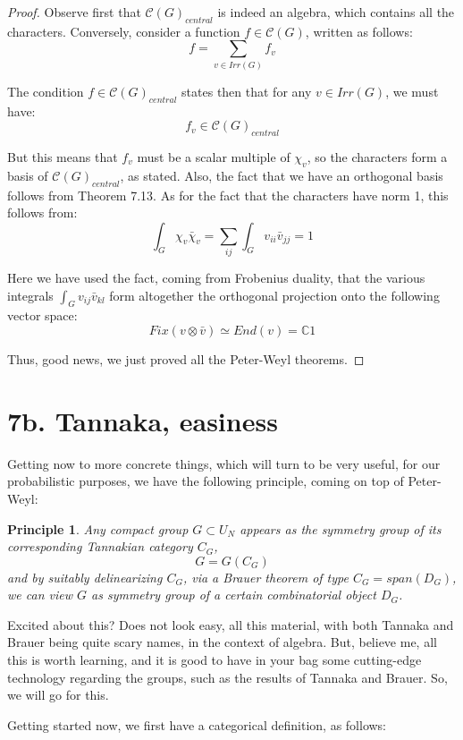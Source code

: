 \documentclass[12pt]{amsbook}
\newtheorem{principle}[theorem]{Principle}
\begin{document}
\begin{proof}
Observe first that $\mathcal C(G)_{central}$ is indeed an algebra, which contains all the characters. Conversely, consider a function $f\in\mathcal C(G)$, written as follows:
$$f=\sum_{v\in Irr(G)}f_v$$

The condition $f\in\mathcal C(G)_{central}$ states then that for any $v\in Irr(G)$, we must have:
$$f_v\in\mathcal C(G)_{central}$$

But this means that $f_v$ must be a scalar multiple of $\chi_v$, so the characters form a basis of $\mathcal C(G)_{central}$, as stated. Also, the fact that we have an orthogonal basis follows from Theorem 7.13. As for the fact that the characters have norm 1, this follows from:
$$\int_G\chi_v\bar{\chi}_v
=\sum_{ij}\int_Gv_{ii}\bar{v}_{jj}
=1$$

Here we have used the fact, coming from Frobenius duality, that the various integrals $\int_Gv_{ij}\bar{v}_{kl}$ form altogether the orthogonal projection onto the following vector space:
$$Fix(v\otimes\bar{v})\simeq End(v)=\mathbb C1$$

Thus, good news, we just proved all the Peter-Weyl theorems.
\end{proof}

\section*{7b. Tannaka, easiness}

Getting now to more concrete things, which will turn to be very useful, for our probabilistic purposes, we have the following principle, coming on top of Peter-Weyl:

\begin{principle}
Any compact group $G\subset U_N$ appears as the symmetry group of its corresponding Tannakian category $C_G$,
$$G=G(C_G)$$
and by suitably delinearizing $C_G$, via a Brauer theorem of type $C_G=span(D_G)$, we can view $G$ as symmetry group of a certain combinatorial object $D_G$.
\end{principle}

Excited about this? Does not look easy, all this material, with both Tannaka and Brauer being quite scary names, in the context of algebra. But, believe me, all this is worth learning, and it is good to have in your bag some cutting-edge technology regarding the groups, such as the results of Tannaka and Brauer. So, we will go for this.

\bigskip

Getting started now, we first have a categorical definition, as follows:
\end{document}
